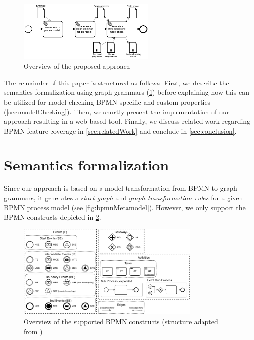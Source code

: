 \documentclass[submission, copyright, creativecommons]{eptcs}
\begin{document}
\begin{figure}[h]
    \centering
    \includegraphics[width=0.6\textwidth]{images/full-approach.pdf}
    \caption{Overview of the proposed approach}
    \label{fig:approach}
\end{figure}

The remainder of this paper is structured as follows.
First, we describe the semantics formalization using graph grammars (\cref{sec:formalization}) before explaining how this can be utilized for model checking BPMN-specific and custom properties (\cref{sec:modelChecking}).
Then, we shortly present the implementation of our approach resulting in a web-based tool.
Finally, we discuss related work regarding BPMN feature coverage in \cref{sec:relatedWork} and conclude in \cref{sec:conclusion}.

\section{Semantics formalization} \label{sec:formalization}

Since our approach is based on a model transformation from BPMN to graph grammars, it generates a \emph{start graph} and \emph{graph transformation rules} for a given BPMN process model (see \cref{fig:bpmnMetamodel}).
However, we only support the BPMN constructs depicted in \cref{fig:bpmnConstructsOverview}.

\begin{figure}[h]
    \centering
    \includegraphics[width=0.8\textwidth]{images/bpmn_semantics-feature_overview.pdf}
    \caption{Overview of the supported BPMN constructs (structure adapted from \cite{houhouFirstOrderLogicVerification2022})}
    \label{fig:bpmnConstructsOverview}
\end{figure}
\end{document}
